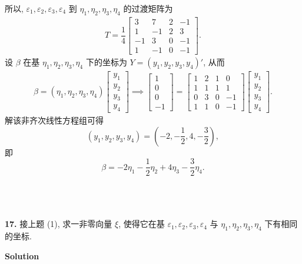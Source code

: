 \documentclass[11pt,a4paper,openany,oneside]{book}
\newcommand\Solution{\noindent\textbf{\textsf{Solution}}\par\medskip}
\begin{document}
\begin{enumerate}
所以, $ \varepsilon_1, \varepsilon_2, \varepsilon_3, \varepsilon_4 $ 到 $ \eta_1, \eta_2, \eta_3, \eta_4 $ 的过渡矩阵为
\begin{gather*}
T =  \dfrac{1}{4}
\begin{bmatrix}
3 & 7 & 2 & -1 \\
1 & -1 & 2 & 3 \\
-1 & 3 & 0 & -1 \\
1 & -1 & 0 & -1
\end{bmatrix}.
\end{gather*}
设 $ \beta $ 在基 $ \eta_1, \eta_2, \eta_3, \eta_4 $ 下的坐标为 $ Y=(y_1, y_2, y_3, y_4)' $, 从而
\begin{gather*}
\beta = (\eta_1, \eta_2, \eta_3, \eta_4)
\begin{bmatrix}
y_1\\ y_2\\ y_3\\ y_4
\end{bmatrix} \implies
\begin{bmatrix}
1 \\ 0\\ 0\\ -1
\end{bmatrix}
=
\begin{bmatrix}
1  &  2  &  1  &  0  \\
1  &  1  &  1  &  1  \\
0 &  3  &  0  &   -1  \\
1  &  1  &  0  &  -1  
\end{bmatrix}
\begin{bmatrix}
y_1\\ y_2\\ y_3\\ y_4
\end{bmatrix} 
.
\end{gather*}
解该非齐次线性方程组可得
 $$  (y_1, y_2, y_3, y_4) = (-2, -\dfrac{1}{2},4, -\dfrac{3}{2} ) , $$ 
即
 $$  \beta = -2\eta_1 -\dfrac{1}{2}\eta_2 + 4\eta_3 - \dfrac{3}{2}\eta_4.  $$   \\  \\  \\
\end{enumerate}


\begin{myexample}
\textbf{17.} 接上题 (1), 求一非零向量 $\xi$, 使得它在基 $\varepsilon_1, \varepsilon_2, \varepsilon_3, \varepsilon_4$ 与 $\eta_1, \eta_2, \eta_3, \eta_4 $ 下有相同的坐标. 

\end{myexample}
\Solution
\end{document}
